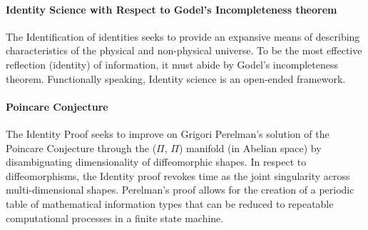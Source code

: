 \documentclass{article}
\begin{document}
		\paragraph{Identity Science with Respect to Godel's Incompleteness theorem}
				The Identification of identities seeks to provide an expansive means of describing characteristics of the physical and non-physical universe.  To be the most effective reflection (identity) of information, it must abide by Godel's incompleteness theorem.  Functionally speaking, Identity science is an open-ended framework.
		\paragraph{Poincare Conjecture}
			The Identity Proof seeks to improve on Grigori Perelman's solution of the Poincare Conjecture through the ($\Pi$, $\Pi$) manifold (in Abelian space) by disambiguating dimensionality of diffeomorphic shapes.  In respect to diffeomorphisms, the Identity proof revokes time as the joint singularity across multi-dimensional shapes.  Perelman's proof allows for the creation of a periodic table of mathematical information types that can be reduced to repeatable computational processes in a finite state machine.
		
\end{document}
